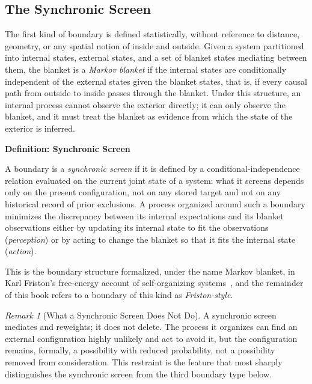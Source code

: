 \documentclass[11pt,fleqn]{book}
\numberwithin{equation}{chapter}
\newenvironment{definition}[1]
  {\begin{definitionEnv}
   \noindent\textbf{Definition: #1}\par\smallskip}
  {\end{definitionEnv}}
\theoremstyle{plain}
\theoremstyle{definition}
\theoremstyle{remark}
\newtheorem{remark}[theorem]{Remark}
\begin{document}
\subsection{The Synchronic Screen}

The first kind of boundary is defined statistically, without reference to distance, geometry, or any spatial notion of inside and outside. Given a system partitioned into internal states, external states, and a set of blanket states mediating between them, the blanket is a \emph{Markov blanket} if the internal states are conditionally independent of the external states given the blanket states, that is, if every causal path from outside to inside passes through the blanket. Under this structure, an internal process cannot observe the exterior directly; it can only observe the blanket, and it must treat the blanket as evidence from which the state of the exterior is inferred.

\begin{definition}{Synchronic Screen}
A boundary is a \emph{synchronic screen} if it is defined by a conditional-independence relation evaluated on the current joint state of a system: what it screens depends only on the present configuration, not on any stored target and not on any historical record of prior exclusions. A process organized around such a boundary minimizes the discrepancy between its internal expectations and its blanket observations either by updating its internal state to fit the observations (\emph{perception}) or by acting to change the blanket so that it fits the internal state (\emph{action}).
\end{definition}

This is the boundary structure formalized, under the name Markov blanket, in Karl Friston's free-energy account of self-organizing systems~\cite{friston2019,kirchhoff2018}, and the remainder of this book refers to a boundary of this kind as \emph{Friston-style}.

\begin{remark}[What a Synchronic Screen Does Not Do]
A synchronic screen mediates and reweights; it does not delete. The process it organizes can find an external configuration highly unlikely and act to avoid it, but the configuration remains, formally, a possibility with reduced probability, not a possibility removed from consideration. This restraint is the feature that most sharply distinguishes the synchronic screen from the third boundary type below.
\end{remark}
\end{document}

